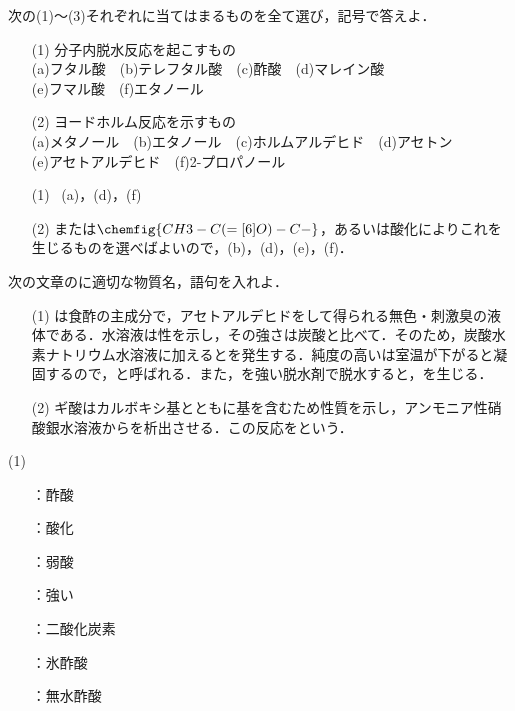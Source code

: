 \documentclass[a4paper,12pt]{ltjsreport}
\begin{document}
\newpage
\begin{que}
次の(1)〜(3)それぞれに当てはまるものを全て選び，記号で答えよ．
\begin{itemize}
    \item [(1)]分子内脱水反応を起こすもの\\
    (a)フタル酸　(b)テレフタル酸　(c)酢酸　(d)マレイン酸　\\(e)フマル酸　(f)エタノール
    \item[(2)]ヨードホルム反応を示すもの\\
     (a)メタノール　(b)エタノール　(c)ホルムアルデヒド　(d)アセトン\\
     (e)アセトアルデヒド　(f)2-プロパノール
\end{itemize}
\end{que}
\ans 
\begin{itemize}
    \item [(1)]~(a)，(d)，(f)　\\[20pt]
    \item [(2)]または$\chemfig{CH3-C(=[6]O)-C-}$，あるいは酸化によりこれを生じるものを選べばよいので，(b)，(d)，(e)，(f)．
\end{itemize}
\newpage
\begin{que}
次の文章の\fbox{　}に適切な物質名，語句を入れよ．
\begin{itemize}
    \item[(1)] は食酢の主成分で，アセトアルデヒドをして得られる無色・刺激臭の液体である．水溶液は性を示し，その強さは炭酸と比べて．そのため，炭酸水素ナトリウム水溶液に加えるとを発生する．純度の高いは室温が下がると凝固するので，と呼ばれる．また，を強い脱水剤で脱水すると，を生じる．
    \item [(2)]ギ酸はカルボキシ基とともに基を含むため性質を示し，アンモニア性硝酸銀水溶液からを析出させる．この反応をという．
\end{itemize}
\end{que}
\ans 
\begin{minipage}{0.5\linewidth}
\noindent (1)\begin{itemize}
   \item [\fbox{ア}]：酢酸\\
  \item [\fbox{イ}]：酸化\\
  \item [\fbox{ウ}]：弱酸\\
  \item [\fbox{エ}]：強い\\
  \item [\fbox{オ}]：二酸化炭素\\
  \item [\fbox{カ}]：氷酢酸\\
  \item [\fbox{キ}]：無水酢酸
\end{itemize}
\end{minipage}
\end{document}
